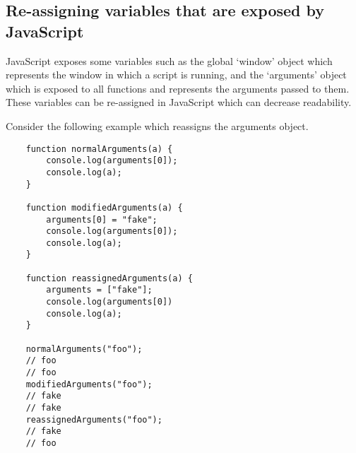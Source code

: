 \documentclass[11pt,a4paper]{article}
\begin{document}
\subsection{Re-assigning variables that are exposed by JavaScript}
JavaScript exposes some variables such as the global `window' object
which represents the window in which a script is running,
and the `arguments' object which is exposed to all functions and represents the arguments passed to them.
These variables can be re-assigned in JavaScript which can decrease readability.

Consider the following example which reassigns the arguments object.
\begin{verbatim}
    function normalArguments(a) {
        console.log(arguments[0]);
        console.log(a);
    }

    function modifiedArguments(a) {
        arguments[0] = "fake";
        console.log(arguments[0]);
        console.log(a);
    }

    function reassignedArguments(a) {
        arguments = ["fake"];
        console.log(arguments[0])
        console.log(a);
    }

    normalArguments("foo");
    // foo
    // foo
    modifiedArguments("foo");
    // fake
    // fake
    reassignedArguments("foo");
    // fake
    // foo
\end{verbatim}
\end{document}
